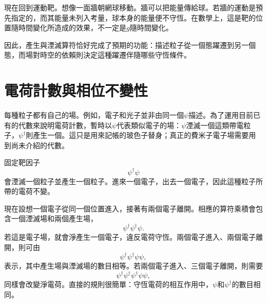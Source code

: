 \begin{classroomqa}
\end{classroomqa}

現在回到運動靶。想像一面牆朝網球移動。牆可以把能量傳給球。若牆的運動是預先指定的，而其能量未列入考量，球本身的能量便不守恆。在數學上，這是靶的位置隨時間變化所造成的效果，不一定是\(g\)隨時間變化。

因此，產生與湮滅算符恰好完成了預期的功能：描述粒子從一個態躍遷到另一個態，而場對時空的依賴則決定這種躍遷伴隨哪些守恆條件。

\section{電荷計數與相位不變性}

每種粒子都有自己的場。例如，電子和光子並非由同一個\(\psi\)描述。為了運用目前已有的代數來說明電荷計數，暫時以\(\psi\)代表類似電子的場：\(\psi\)湮滅一個這類帶電粒子，\(\psi^\dagger\)則產生一個。這只是用來記帳的玻色子替身；真正的費米子電子場需要用到尚未介紹的代數。

固定靶因子
\begin{equation}
\psi^\dagger\psi
\end{equation}
會湮滅一個粒子並產生一個粒子。進來一個電子，出去一個電子，因此這種粒子所帶的電荷不變。

現在設想一個電子從同一個位置進入，接著有兩個電子離開。相應的算符乘積會包含一個湮滅場和兩個產生場，
\begin{equation}
\psi^\dagger\psi^\dagger\psi.
\end{equation}
若這是電子場，就會淨產生一個電子，違反電荷守恆。兩個電子進入、兩個電子離開，則可由
\begin{equation}
\psi^\dagger\psi^\dagger\psi\psi,
\end{equation}
表示，其中產生場與湮滅場的數目相等。若兩個電子進入、三個電子離開，則需要
\begin{equation}
\psi^\dagger\psi^\dagger\psi^\dagger\psi\psi,
\end{equation}
同樣會改變淨電荷。直接的規則很簡單：守恆電荷的相互作用中，\(\psi\)和\(\psi^\dagger\)的數目相同。

\begin{classroomqa}
\end{classroomqa}

